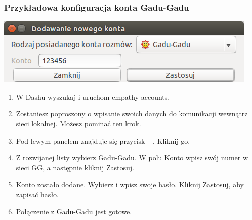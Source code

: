 \subsubsection{Przykładowa konfiguracja konta Gadu-Gadu}
\begin{center}
	\includegraphics[width=\linewidth]{images/programy_empathy1.png}
\end{center}
\begin{enumerate}
\item W Dashu wyszukaj i uruchom \textcolor{ubuntu_orange}{empathy-accounts}.
\item Zostaniesz poproszony o wpisanie swoich danych do komunikacji wewnątrz sieci lokalnej. Możesz pominać ten krok.
\item Pod lewym panelem znajduje się przycisk \textcolor{ubuntu_orange}{+}. Kliknij go.
\item Z rozwijanej listy wybierz \textcolor{ubuntu_orange}{Gadu-Gadu}. W polu \textcolor{ubuntu_orange}{Konto} wpisz swój numer w sieci GG, a następnie kliknij \textcolor{ubuntu_orange}{Zastosuj}.
\item Konto zostało dodane. Wybierz  i wpisz swoje hasło. Kliknij \textcolor{ubuntu_orange}{Zastosuj}, aby zapisać hasło.
\item Połączenie z Gadu-Gadu jest gotowe.
\end{enumerate}
\clearpage
